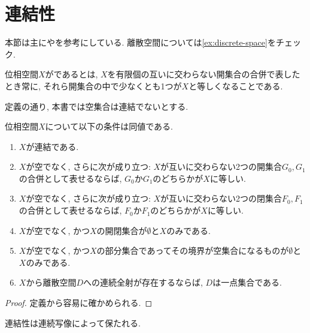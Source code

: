 \documentclass[uplatex, dvipdfmx, a4paper, 12pt, class=jsbook, crop=false]{standalone}
\begin{document}
\section{連結性}
\label{sec:connected-spaces}

\begin{source}
	本節は主に\cite[Chapter 6]{Engelking1989GT}や\cite[第４章]{Morita1981ja}を参考にしている.
	離散空間については\cref{ex:discrete-space}をチェック.
\end{source}

\begin{definition}
	位相空間$ X $がであるとは, $ X $を有限個の互いに交わらない開集合の合併で表したとき常に,
	それら開集合の中で少なくとも1つが$ X $と等しくなることである.
\end{definition}
定義の通り, 本書では空集合は連結でないとする.

\begin{proposition}
	\label{prop:Characterization of connectedness}
	位相空間$ X $について以下の条件は同値である.
		\begin{enumerate}
			\item $ X $が連結である.
			\item $ X $が空でなく, さらに次が成り立つ: $ X $が互いに交わらない2つの開集合$ G_0, G_1 $の合併として表せるならば,
			      $ G_0 $か$ G_1 $のどちらかが$ X $に等しい.
			\item $ X $が空でなく, さらに次が成り立つ: $ X $が互いに交わらない2つの閉集合$ F_0, F_1 $の合併として表せるならば,
			$ F_0 $か$ F_1 $のどちらかが$ X $に等しい.
			\item $ X $が空でなく, かつ$ X $の開閉集合が$ \emptyset $と$ X $のみである.
			\item $ X $が空でなく, かつ$ X $の部分集合であってその境界が空集合になるものが$ \emptyset $と$ X $のみである.
			\item $ X $から離散空間$ D $への連続全射が存在するならば, $ D $は一点集合である.
		\end{enumerate}
\end{proposition}

\begin{proof}
	定義から容易に確かめられる.
\end{proof}

\begin{proposition}
	\label{prop:Continuous maps preserve connectedness}
	連結性は連続写像によって保たれる.
\end{proposition}
\end{document}
